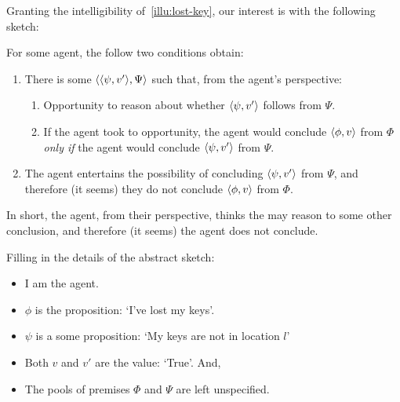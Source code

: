 \begin{note}
  Granting the intelligibility of~\autoref{illu:lost-key}, our interest is with the following sketch:

  \begin{sketch}
    \label{sketch:zS:fail}
    For some agent, the follow two conditions obtain:
    \begin{enumerate}
      \label{skech:zS:fail:requ}
    \item
    There is some \(\langle \langle \psi, v' \rangle, \Psi \rangle\) such that, from the agent's perspective:
    \begin{enumerate}[label=\alph*., ref=(\alph*)]
    \item
      \label{sketch:zS:fail:requ:opportunity}
      Opportunity to reason about whether \(\langle \psi, v' \rangle\) follows from \(\Psi\).
    \item
      \label{sketch:zS:fail:requ:conditional}
      If the agent took to opportunity, the agent would conclude \(\langle \phi, v \rangle\) from \(\Phi\) \emph{only if} the agent would conclude \(\langle \psi, v' \rangle\) from \(\Psi\).
    \end{enumerate}

  \item
    \label{sketch:zS:fail:no-c}
    The agent entertains the possibility of concluding \(\langle \psi, v' \rangle\) from \(\Psi\), and therefore (it seems) they do not conclude \(\langle \phi, v \rangle\) from \(\Phi\).
  \end{enumerate}
  \vspace{-\baselineskip}
  \end{sketch}

  In short, the agent, from their perspective, thinks the may reason to some other conclusion, and therefore (it seems) the agent does not conclude.

  Filling in the details of the abstract sketch:
  \begin{itemize}[noitemsep]
  \item
    I am the agent.
  \item
    \(\phi\) is the proposition: `I've lost my keys'.
  \item
    \(\psi\) is a some proposition: `My keys are not in location \(l\)'
  \item
    Both \(v\) and \(v'\) are the value: `True'.
    And,
  \item
    The pools of premises \(\Phi\) and \(\Psi\) are left unspecified.
  \end{itemize}
\end{note}

